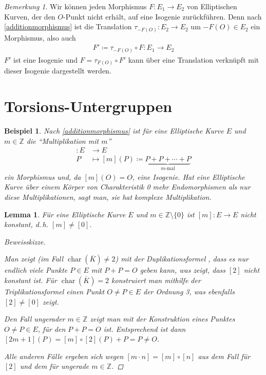 \documentclass[english, german, parskip=half]{scrartcl}
\newtheorem{Lemma}[Satz]{Lemma}
\newtheorem{Beispiel}[Satz]{Beispiel}
\theoremstyle{definition}
\theoremstyle{remark}
\newtheorem{Bemerkung}[Satz]{Bemerkung}
\newcommand*{\Z}{\mathds{Z}}
\newcommand*{\algK}{\ensuremath{\overline K}} %
\newcommand*{\longto}{\longrightarrow}
\DeclareMathOperator{\Char}{char} %
\begin{document}
\begin{Bemerkung}
Wir können jeden Morphismus $F\colon E_1\to E_2$ von Elliptischen
Kurven, der den $O$-Punkt nicht erhält, auf eine Isogenie
zurückführen.
Denn nach \autoref{additionmorphismus} ist die Translation
$\tau_{-F(O)}\colon E_2\to E_2$ um $-F(O)\in E_2$
ein Morphismus, also auch 
\begin{gather*}
  F'\coloneqq\tau_{-F(O)}\circ F\colon E_1\to E_2
\end{gather*}
$F'$ ist eine Isogenie und $F=\tau_{F(O)}\circ F'$ kann über
eine Translation verknüpft mit dieser Isogenie dargestellt werden.
\end{Bemerkung}

\section{Torsions-Untergruppen}

\begin{Beispiel}
  Nach \autoref{additionmorphismus} ist für eine Elliptische Kurve $E$
  und $m\in\Z$ die \enquote{Multiplikation mit $m$}
  \begin{align*}
    [m]\colon E &\longto E\\
    P&\longmapsto [m](P) \coloneqq
       \underbrace{P+P+\dotsb+P}_{m\text{-mal}}
  \end{align*}
  ein Morphismus und, da $[m](O)=O$, eine Isogenie.
  Hat eine Elliptische Kurve über einem Körper von Charakteristik 0
  mehr Endomorphismen als nur diese Multiplikationen, sagt man,
  sie hat komplexe Multiplikation.
\end{Beispiel}

\begin{Lemma}\label{additionnichtkonstant}
  Für eine Elliptische Kurve $E$ und $m\in\Z\setminus\{0\}$
  ist $[m]\colon E\to E$ nicht konstant, d.\,h. $[m]\neq[0]$.
  \begin{proof}[Beweisskizze]
    \cite[siehe][Proposition 4.2 (a)]{silverman}
    
    Man zeigt (im Fall $\Char(\algK)\neq2$) mit der Duplikationsformel
    \cite[Group Law Algorithm III.2.3(d)]{silverman},
    dass es nur endlich viele Punkte $P\in E$ mit $P+P=O$ geben kann,
    was zeigt, dass $[2]$ nicht konstant ist.
    Für $\Char(\algK)=2$ konstruiert man mithilfe der
    Triplikationsformel \cite[Exercise III.3.2]{silverman}
    einen Punkt $O\neq P\in E$ der Ordnung 3, was
    ebenfalls $[2]\neq[0]$ zeigt.

    Den Fall ungerader $m\in\Z$ zeigt man mit der Konstruktion eines 
    Punktes $O\neq P\in E$, für den $P+P=O$ ist. Entsprechend ist dann
    $[2m+1](P)=[m]\circ[2](P)+P=P\neq O$.
    
    Alle anderen Fälle ergeben sich wegen 
    $[m\cdot n]=[m]\circ[n]$ aus dem Fall für $[2]$ und dem für ungerade
    $m\in\Z$.
  \end{proof}
\end{Lemma}
\end{document}
